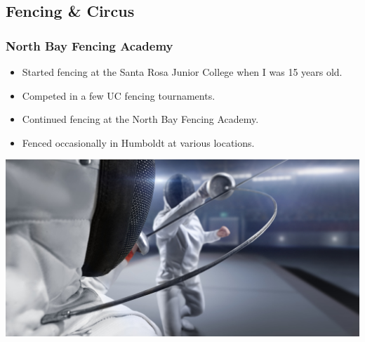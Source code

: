 \documentclass{beamer}
\begin{document}
\subsection{Fencing \& Circus}
\begin{frame}
	\frametitle{North Bay Fencing Academy}
	\begin{itemize}
		\item Started fencing at the Santa Rosa Junior College when I was 15 years old.
		\item Competed in a few UC fencing tournaments.
		\item Continued fencing at the North Bay Fencing Academy.
		\item Fenced occasionally in Humboldt at various locations.
	\end{itemize}
	\begin{center}
		\includegraphics[width = 1.0\textwidth]{images/fencing.jpg}
	\end{center}
\end{frame}
\end{document}
